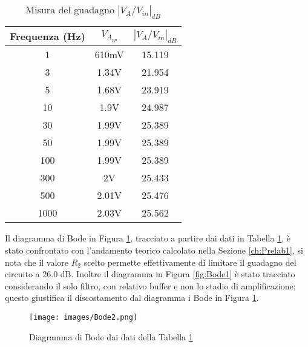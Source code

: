 \begin{table}[H]
    \centering
    \begin{tabular}{|c|c|c|}
        \hline
        Frequenza (Hz)&$V_{A_{pp}}$&$\left|V_A/V_{in}\right|_{dB}$\\\hline\hline
        1&610mV&15.119\\\hline
        3&1.34V&21.954\\\hline
        5&1.68V&23.919\\\hline
        10&1.9V&24.987\\\hline
        30&1.99V&25.389\\\hline
        50&1.99V&25.389\\\hline
        100&1.99V&25.389\\\hline
        300&2V&25.433\\\hline
        500&2.01V&25.476\\\hline
        1000&2.03V&25.562\\\hline
    \end{tabular}
    \caption{Misura del guadagno $\left|V_A/V_{in}\right|_{dB}$}
    \label{tab:Ris1}
\end{table}
Il diagramma di Bode in Figura \ref{fig:Bode2}, tracciato a partire dai dati in Tabella \ref{tab:Ris1}, è stato confrontato con l'andamento teorico calcolato nella Sezione \ref{ch:Prelab1}, si nota che il valore $R_2$ scelto permette effettivamente di limitare il guadagno del circuito a $26.0\text{ dB}$. Inoltre il diagramma in Figura \ref{fig:Bode1} è stato tracciato considerando il solo filtro, con relativo buffer e non lo stadio di amplificazione; questo giustifica il discostamento dal diagramma i Bode in Figura \ref{fig:Bode2}.
\begin{figure}[H]
    \centering
    \texttt{[image: images/Bode2.png]}
    \caption{Diagramma di Bode dai dati della Tabella \ref{tab:Ris1}}
    \label{fig:Bode2}
\end{figure}
\clearpage
